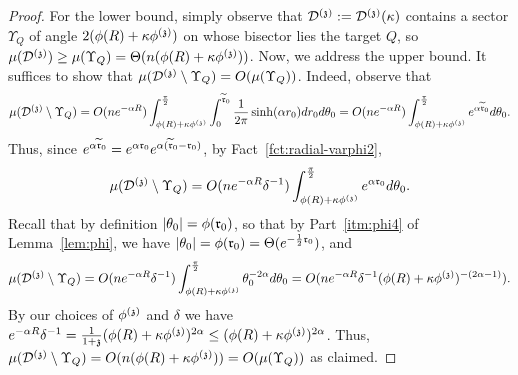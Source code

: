 \begin{proof}
For the lower bound, simply observe that $\dt:=\dt(\kappa)$ contains a sector $\Upsilon_Q$ 
  of angle $2(\phi(R)+\kappa\phi^{(\ss)})$ on whose bisector lies the target $Q$,
  so  $\mu(\dt)\geq\mu(\Upsilon_Q)=\Theta(n(\phi(R)+\kappa\phi^{(\ss)}))$.
Now, we address the upper bound. 
It suffices to show that $\mu(\dt\setminus\Upsilon_Q)=O(\mu(\Upsilon_Q))$.
Indeed, observe that
\[
\mu(\dt\setminus\Upsilon_Q) 
= O(ne^{-\alpha R})\int_{\phi(R)+\kappa\phi^{(\ss)}}^{\frac{\pi}{2}}\int_0^{\widetilde{\rabs}_0}\frac{1}{2\pi}\sinh(\alpha r_0)dr_0d\theta_0
= O(ne^{-\alpha R})\int_{\phi(R)+\kappa\phi^{(\ss)}}^{\frac{\pi}{2}}e^{\alpha\widetilde{\rabs}_0}d\theta_0.
\]
Thus, since $e^{\alpha\widetilde{\rabs}_0}=e^{\alpha\rabs_0}e^{\alpha(\widetilde{\rabs}_0-\rabs_0)}$, by Fact~\ref{fct:radial-varphi2},
\[
\mu(\dt\setminus\Upsilon_Q) = 
  O(ne^{-\alpha R}\delta^{-1})
  \int_{\phi(R)+\kappa\phi^{(\ss)}}^{\frac{\pi}{2}}e^{\alpha\rabs_0}d\theta_0.
\]
Recall that by definition $|\theta_0|=\phi(\rabs_0)$, so that by Part~\eqref{itm:phi4} of Lemma~\ref{lem:phi}, we have  $|\theta_0|=\phi(\rabs_0)=\Theta(e^{-\frac12\rabs_0})$, 
and
\[
 \mu(\dt\setminus\Upsilon_Q) = O(ne^{-\alpha R}\delta^{-1})\int_{\phi(R)+\kappa\phi^{(\ss)}}^{\frac{\pi}{2}}\theta_0^{-2\alpha}d\theta_0
= O(ne^{-\alpha R}\delta^{-1}(\phi(R)+\kappa\phi^{(\ss)})^{-(2\alpha-1)}).
\]
By our choices of $\phi^{(\ss)}$ and $\delta$ 
  we have $e^{-\alpha R}\delta^{-1}=\frac{1}{1+\ss}(\phi(R)+\kappa\phi^{(\ss)})^{2\alpha}
  \leq (\phi(R)+\kappa\phi^{(\ss)})^{2\alpha}$.
Thus, $\mu(\dt\setminus\Upsilon_Q)=O(n(\phi(R)+\kappa\phi^{(\ss)}))=O(\mu(\Upsilon_Q))$ as claimed. 
\end{proof}

